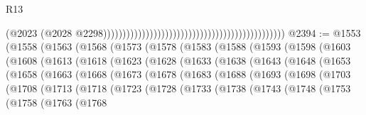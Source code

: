 \begin{lexlean}{R13}
\begin{coremodule}
{{{{{{{{{{{{{{{{{{{{{{{{{{{{{{{{{{{{{{{{{{{{{{{{{{{{{{{{{{{{{{{{{{{{{{{{{{{{{{{{{{{{{{{{{{{{{{{{{{{{{{{{{{                                                                                              (@2023
                                                                                                (@2028
                                                                                                  @2298)))))))))))))))))))))))))))))))))))))))))))))))
@2394 := @1553
    (@1558
      (@1563
        (@1568
          (@1573
            (@1578
              (@1583
                (@1588
                  (@1593
                    (@1598
                      (@1603
                        (@1608
                          (@1613
                            (@1618
                              (@1623
                                (@1628
                                  (@1633
                                    (@1638
                                      (@1643
                                        (@1648
                                          (@1653
                                            (@1658
                                              (@1663
                                                (@1668
                                                  (@1673
                                                    (@1678
                                                      (@1683
                                                        (@1688
                                                          (@1693
                                                            (@1698
                                                              (@1703
                                                                (@1708
                                                                  (@1713
                                                                    (@1718
                                                                      (@1723
                                                                        (@1728
                                                                          (@1733
                                                                            (@1738
                                                                              (@1743
                                                                                (@1748
                                                                                  (@1753
                                                                                    (@1758
                                                                                      (@1763
                                                                                        (@1768
}}}}}}}}}}}}}}}}}}}}}}}}}}}}}}}}}}}}}}}}}}}}}}}}}}}}}}}}}}}}}}}}}}}}}}}}}}}}}}}}}}}}}}}}}}}}}}}}}}}}}}}}}}
\end{coremodule}
\end{lexlean}
